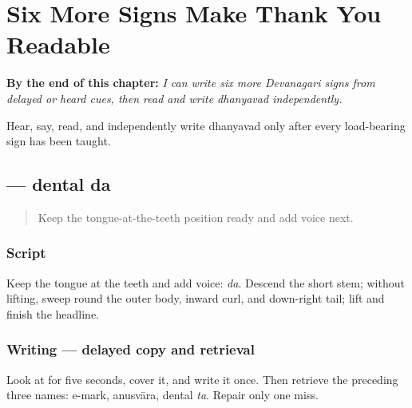 
\chapter{Six More Signs Make Thank You Readable}
\label{ch:thanks-script-b}

\begin{chapteropening}
\textbf{By the end of this chapter:} \emph{I can write six more Devanagari signs from delayed or heard cues, then read and write dhanyavad independently.}

Hear, say, read, and independently write dhanyavad only after every load-bearing sign has been taught.
\end{chapteropening}

\section[\texorpdfstring{\mr{द} (da)}{द (da)}]{ — dental da}

\label{lesson:MR-W03-da}



\begin{quote}
Keep the tongue-at-the-teeth position ready and add voice next.
\end{quote}

\subsection*{Script}
\begin{quote}
\end{quote}

Keep the tongue at the teeth and add voice: \emph{da}. Descend the short stem; without lifting, sweep round the outer body, inward curl, and down-right tail; lift and finish the headline.

\subsection*{Writing — delayed copy and retrieval}

Look at \textbf{} for five seconds, cover it, and write it once. Then retrieve the preceding three names: e-mark, anusvāra, dental \emph{ta}. Repair only one miss.

